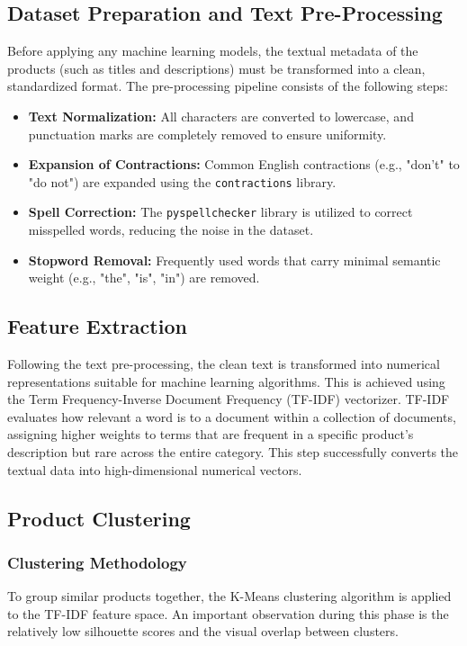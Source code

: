 \documentclass[a4paper, 12pt]{article}
\begin{document}
\subsection{Dataset Preparation and Text Pre-Processing}
Before applying any machine learning models, the textual metadata of the products (such as titles and descriptions) must be transformed into a clean, standardized format. The pre-processing pipeline consists of the following steps:
\begin{itemize}
    \item \textbf{Text Normalization:} All characters are converted to lowercase, and punctuation marks are completely removed to ensure uniformity.
    \item \textbf{Expansion of Contractions:} Common English contractions (e.g., "don't" to "do not") are expanded using the \texttt{contractions} library.
    \item \textbf{Spell Correction:} The \texttt{pyspellchecker} library is utilized to correct misspelled words, reducing the noise in the dataset.
    \item \textbf{Stopword Removal:} Frequently used words that carry minimal semantic weight (e.g., "the", "is", "in") are removed.
\end{itemize}

\subsection{Feature Extraction}
Following the text pre-processing, the clean text is transformed into numerical representations suitable for machine learning algorithms. This is achieved using the Term Frequency-Inverse Document Frequency (TF-IDF) vectorizer. TF-IDF evaluates how relevant a word is to a document within a collection of documents, assigning higher weights to terms that are frequent in a specific product's description but rare across the entire category. This step successfully converts the textual data into high-dimensional numerical vectors.

\subsection{Product Clustering}

\subsubsection{Clustering Methodology}
To group similar products together, the K-Means clustering algorithm is applied to the TF-IDF feature space. An important observation during this phase is the relatively low silhouette scores and the visual overlap between clusters. 
\end{document}
